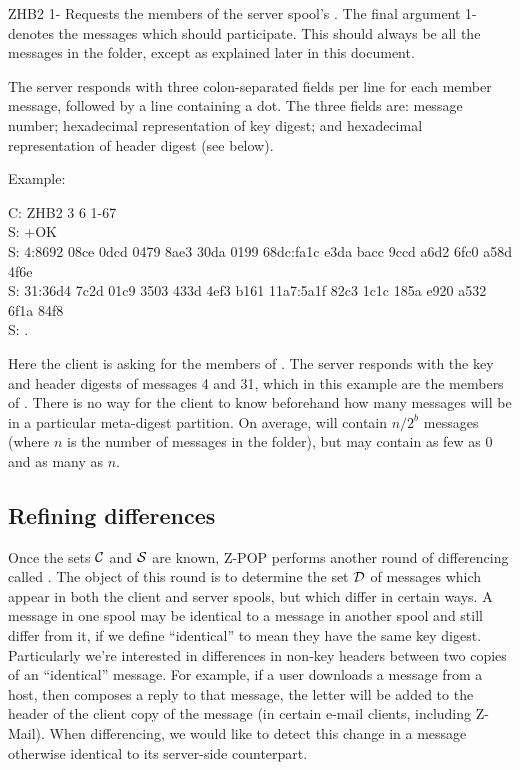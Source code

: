 \begin{codelist}
\item[ZHB2 \var{b} \var{p} 1-\var{n}] Requests the members of the
server spool's .  The final argument 1- denotes the
messages which should participate.  This should always be all the
messages in the folder, except as explained later in this document.

The server responds with three colon-separated fields per line for
each member message, followed by a line containing a dot.  The three
fields are: message number; hexadecimal representation of key digest;
and hexadecimal representation of header digest (see below).

Example:

\begin{conversation}
C: ZHB2 3 6 1-67 \\
S: +OK \\
S: 4:8692 08ce 0dcd 0479 8ae3 30da 0199 68dc:fa1c e3da bacc 9ccd a6d2 6fc0 a58d 4f6e \\
S: 31:36d4 7c2d 01c9 3503 433d 4ef3 b161 11a7:5a1f 82c3 1c1c 185a e920 a532 6f1a 84f8 \\
S: .
\end{conversation}

Here the client is asking for the members of .  The server
responds with the key and header digests of messages 4 and 31, which
in this example are the members of .  There is no way for
the client to know beforehand how many messages will be in a
particular meta-digest partition.  On average,  will contain
$n/{2^b}$ messages (where $n$ is the number of messages in the
folder), but may contain as few as 0 and as many as $n$.
\end{codelist}

\subsection{Refining differences}

Once the sets ${\cal C}$ and ${\cal S}$ are known, Z-POP
performs another round of differencing called .  The
object of this round is to determine the set ${\cal D}$ of messages
which appear in both the client and server spools, but which differ in
certain ways.  A message in one spool may be identical to a message in
another spool and still differ from it, if we define ``identical'' to
mean they have the same key digest.  Particularly we're interested in
differences in non-key headers between two copies of an ``identical''
message.  For example, if a user downloads a message from a host, then
composes a reply to that message, the letter  will be added to
the  header of the client copy of the message (in certain
e-mail clients, including Z-Mail).  When differencing, we would like
to detect this change in a message otherwise identical to its
server-side counterpart.

